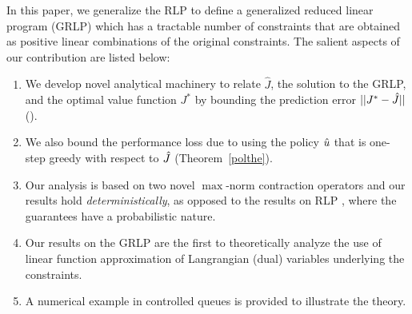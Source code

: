 In this paper, we generalize the RLP to define a generalized reduced linear program (GRLP) which has a tractable number of constraints that are obtained as positive linear combinations of the original constraints.
The salient aspects of our contribution are listed below:
\begin{enumerate}
		\item We develop novel analytical machinery to relate $\hat{J}$, the solution to the GRLP, and the optimal value function $J^*$ by bounding the prediction error $||J^*-\hat{J}||$ (). 
		\item We also bound the performance loss due to using the policy $\hat{u}$ that is one-step greedy with respect to $\hat{J}$ (Theorem~\ref{polthe}).
		\item Our analysis is based on two novel $\max$-norm contraction operators and our results hold \emph{deterministically}, as opposed to the results on RLP \cite{SALP,CS}, where the guarantees have a probabilistic nature.
		\item Our results on the GRLP are the first to theoretically analyze the use of linear function approximation of Langrangian (dual) variables underlying the constraints.
		\item A numerical example in controlled queues is provided to illustrate the theory.
\end{enumerate}

